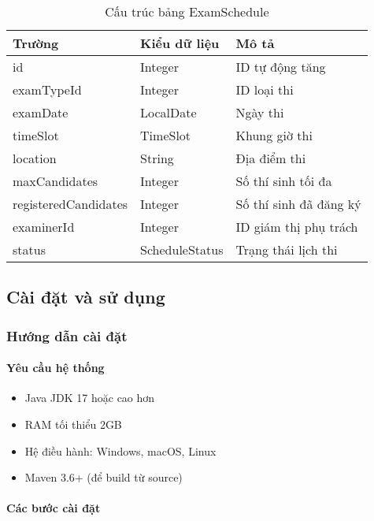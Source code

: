 \documentclass[12pt,a4paper]{article}
\begin{document}
\begin{table}[H]
\centering
\caption{Cấu trúc bảng ExamSchedule}
\label{tab:examschedule_structure}
\begin{tabular}{|l|l|l|}
\hline
\textbf{Trường} & \textbf{Kiểu dữ liệu} & \textbf{Mô tả} \\
\hline
id & Integer & ID tự động tăng \\
\hline
examTypeId & Integer & ID loại thi \\
\hline
examDate & LocalDate & Ngày thi \\
\hline
timeSlot & TimeSlot & Khung giờ thi \\
\hline
location & String & Địa điểm thi \\
\hline
maxCandidates & Integer & Số thí sinh tối đa \\
\hline
registeredCandidates & Integer & Số thí sinh đã đăng ký \\
\hline
examinerId & Integer & ID giám thị phụ trách \\
\hline
status & ScheduleStatus & Trạng thái lịch thi \\
\hline
\end{tabular}
\end{table}

\subsection{Cài đặt và sử dụng}

\subsubsection{Hướng dẫn cài đặt}

\paragraph{Yêu cầu hệ thống}
\begin{itemize}
    \item Java JDK 17 hoặc cao hơn
    \item RAM tối thiểu 2GB
    \item Hệ điều hành: Windows, macOS, Linux
    \item Maven 3.6+ (để build từ source)
\end{itemize}

\paragraph{Các bước cài đặt}
\end{document}
